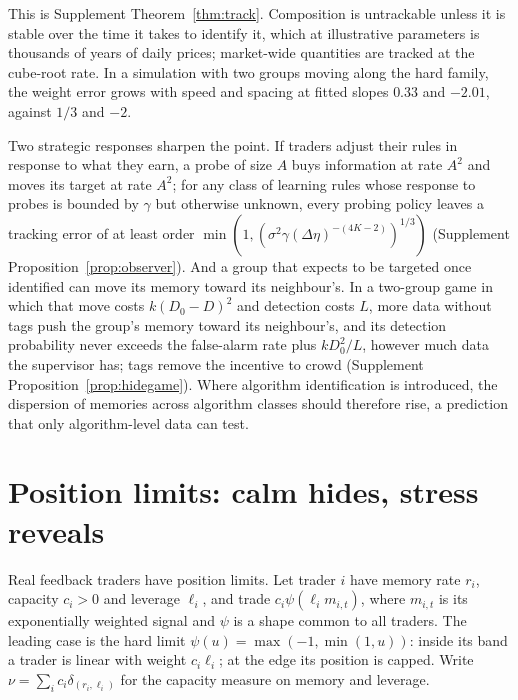 This is Supplement Theorem~\ref{thm:track}. Composition is untrackable unless it is stable over the time it takes to identify it, which at illustrative parameters is thousands of years of daily prices; market-wide quantities are tracked at the cube-root rate. In a simulation with two groups moving along the hard family, the weight error grows with speed and spacing at fitted slopes $0.33$ and $-2.01$, against $1/3$ and $-2$.

Two strategic responses sharpen the point. If traders adjust their rules in response to what they earn, a probe of size $A$ buys information at rate $A^2$ and moves its target at rate $A^2$; for any class of learning rules whose response to probes is bounded by $\gamma$ but otherwise unknown, every probing policy leaves a tracking error of at least order $\min(1,(\sigma^2\gamma(\Delta\eta)^{-(4K-2)})^{1/3})$ (Supplement Proposition~\ref{prop:observer}). And a group that expects to be targeted once identified can move its memory toward its neighbour's. In a two-group game in which that move costs $k(D_0-D)^2$ and detection costs $L$, more data without tags push the group's memory toward its neighbour's, and its detection probability never exceeds the false-alarm rate plus $kD_0^2/L$, however much data the supervisor has; tags remove the incentive to crowd (Supplement Proposition~\ref{prop:hidegame}). Where algorithm identification is introduced, the dispersion of memories across algorithm classes should therefore rise, a prediction that only algorithm-level data can test.

\section{Position limits: calm hides, stress reveals}\label{n:sat}

Real feedback traders have position limits. Let trader $i$ have memory rate $r_i$, capacity $c_i>0$ and leverage $\ell_i$, and trade $c_i\psi(\ell_im_{i,t})$, where $m_{i,t}$ is its exponentially weighted signal and $\psi$ is a shape common to all traders. The leading case is the hard limit $\psi(u)=\max(-1,\min(1,u))$: inside its band a trader is linear with weight $c_i\ell_i$; at the edge its position is capped. Write $\nu=\sum_ic_i\delta_{(r_i,\ell_i)}$ for the capacity measure on memory and leverage.

